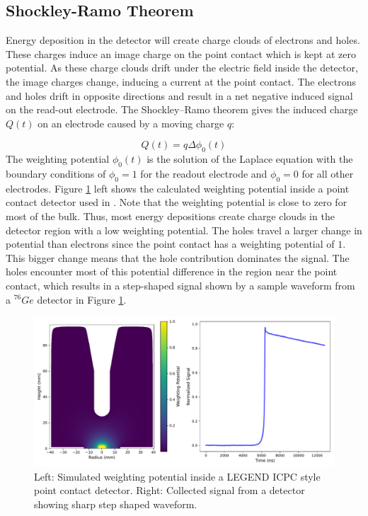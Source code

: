 \subsection{Shockley-Ramo Theorem}
Energy deposition in the detector will create charge clouds of electrons and holes. These charges induce an image charge on the point contact which is kept at zero potential. As these charge clouds drift under the electric field inside the detector, the image charges change, inducing a current at the point contact. The electrons and holes drift in opposite directions and result in a net negative induced signal on the read-out electrode. The Shockley–Ramo theorem gives the induced charge $Q(t)$ on an electrode caused by a moving charge $q$:

\begin{equation}\label{wp_eq}
Q(t)=q\Delta \phi_0(t)
\end{equation}
\noindent
The weighting potential $\phi_0(t)$ is the solution of the Laplace equation with the boundary conditions of $\phi_0=1$ for the readout electrode and $\phi_0=0$ for all other electrodes. Figure \ref{fig:wp_signal} left shows the calculated weighting potential inside a point contact detector used in {\Ltwo}. Note that the weighting potential is close to zero for most of the bulk. Thus, most energy depositions create charge clouds in the detector region with a low weighting potential. The holes travel a larger change in potential than electrons since the point contact has a weighting potential of $1$. This bigger change means that the hole contribution dominates the signal. The holes encounter most of this potential difference in the region near the point contact, which results in a step-shaped signal shown by a sample waveform from a ${}^{76}Ge$ detector in Figure \ref{fig:wp_signal}.

  \begin{figure}[htb]
  \centering
  \includegraphics[trim=0 0.3cm 0 0,clip,width=\linewidth]{ch2/figs/wp_det.pdf}
  \caption{Left: Simulated weighting potential inside a LEGEND ICPC style point contact detector. Right: Collected signal from a detector showing sharp step shaped waveform.}
    \label{fig:wp_signal}
  \end{figure}


